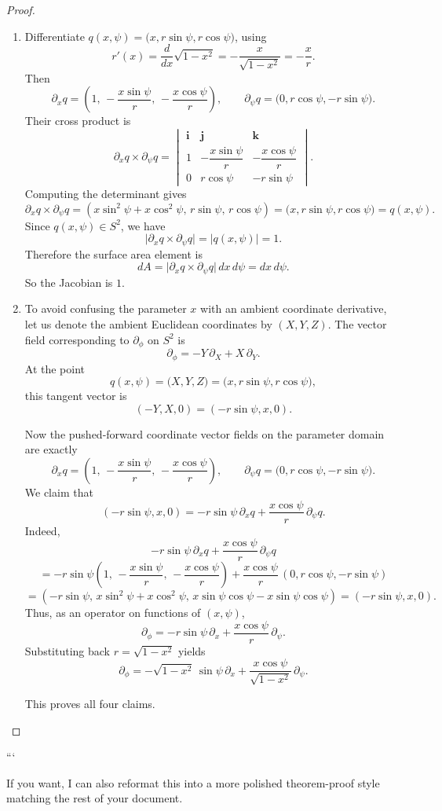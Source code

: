 \begin{proof}
\begin{enumerate}
\item[(iii)] Differentiate $q(x,\psi)=\bigl(x,r\sin\psi,r\cos\psi\bigr)$, using
\[
r'(x)=\frac{d}{dx}\sqrt{1-x^2}=-\frac{x}{\sqrt{1-x^2}}=-\frac{x}{r}.
\]
Then
\[
\partial_x q
=
\left(
1,\,
-\frac{x\sin\psi}{r},\,
-\frac{x\cos\psi}{r}
\right),
\qquad
\partial_\psi q
=
\bigl(0,r\cos\psi,-r\sin\psi\bigr).
\]
Their cross product is
\[
\partial_x q\times \partial_\psi q
=
\begin{vmatrix}
\mathbf{i} & \mathbf{j} & \mathbf{k}\\[2pt]
1 & -\dfrac{x\sin\psi}{r} & -\dfrac{x\cos\psi}{r}\\[6pt]
0 & r\cos\psi & -r\sin\psi
\end{vmatrix}.
\]
Computing the determinant gives
\[
\partial_x q\times \partial_\psi q
=
\left(
x\sin^2\psi+x\cos^2\psi,\,
r\sin\psi,\,
r\cos\psi
\right)
=
\bigl(x,r\sin\psi,r\cos\psi\bigr)
=
q(x,\psi).
\]
Since $q(x,\psi)\in S^2$, we have
\[
\bigl|\partial_x q\times \partial_\psi q\bigr|=|q(x,\psi)|=1.
\]
Therefore the surface area element is
\[
dA=\bigl|\partial_x q\times \partial_\psi q\bigr|\,dx\,d\psi=dx\,d\psi.
\]
So the Jacobian is $1$.

\item[(iv)] To avoid confusing the parameter $x$ with an ambient coordinate derivative, let us denote the ambient Euclidean coordinates by $(X,Y,Z)$. The vector field corresponding to $\partial_\phi$ on $S^2$ is
\[
\partial_\phi=-Y\,\partial_X+X\,\partial_Y.
\]
At the point
\[
q(x,\psi)=\bigl(X,Y,Z\bigr)=\bigl(x,r\sin\psi,r\cos\psi\bigr),
\]
this tangent vector is
\[
(-Y,X,0)=(-r\sin\psi,x,0).
\]

Now the pushed-forward coordinate vector fields on the parameter domain are exactly
\[
\partial_x q
=
\left(
1,\,
-\frac{x\sin\psi}{r},\,
-\frac{x\cos\psi}{r}
\right),
\qquad
\partial_\psi q
=
\bigl(0,r\cos\psi,-r\sin\psi\bigr).
\]
We claim that
\[
(-r\sin\psi,x,0)
=
-r\sin\psi\,\partial_x q
+
\frac{x\cos\psi}{r}\,\partial_\psi q.
\]
Indeed,
\[
-r\sin\psi\,\partial_x q
+
\frac{x\cos\psi}{r}\,\partial_\psi q
\]
\[
=
-r\sin\psi
\left(
1,\,
-\frac{x\sin\psi}{r},\,
-\frac{x\cos\psi}{r}
\right)
+
\frac{x\cos\psi}{r}\,(0,r\cos\psi,-r\sin\psi)
\]
\[
=
\left(
-r\sin\psi,\,
x\sin^2\psi+x\cos^2\psi,\,
x\sin\psi\cos\psi-x\sin\psi\cos\psi
\right)
=
(-r\sin\psi,x,0).
\]
Thus, as an operator on functions of $(x,\psi)$,
\[
\partial_\phi
=
-r\sin\psi\,\partial_x+\frac{x\cos\psi}{r}\,\partial_\psi.
\]
Substituting back $r=\sqrt{1-x^2}$ yields
\[
\partial_\phi
=
-\sqrt{1-x^2}\,\sin\psi\,\partial_x
+
\frac{x\cos\psi}{\sqrt{1-x^2}}\,\partial_\psi.
\]

This proves all four claims.
\end{enumerate}
\end{proof}
```

If you want, I can also reformat this into a more polished theorem-proof style matching the rest of your document.